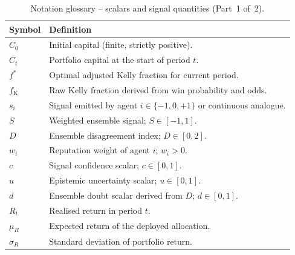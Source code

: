 \documentclass[12pt,openany]{book}
\numberwithin{equation}{chapter}
\theoremstyle{plain}
\theoremstyle{definition}
\theoremstyle{remark}
\numberwithin{equation}{chapter}
\theoremstyle{plain}
\begin{document}
\begin{table}[H]
\centering
\caption{Notation glossary -- scalars and signal quantities (Part~1 of~2).}
\label{tab:notation-1}
\small
\begin{tabularx}{\linewidth}{@{} l X @{}}
\toprule
\textbf{Symbol} & \textbf{Definition} \\
\midrule
$C_0$   & Initial capital (finite, strictly positive). \\[2pt]
$C_t$   & Portfolio capital at the start of period $t$. \\[2pt]
$f^*$   & Optimal adjusted Kelly fraction for current period. \\[2pt]
$f_{\mathrm{K}}$ & Raw Kelly fraction derived from win probability and odds. \\[2pt]
$s_i$   & Signal emitted by agent $i\in\{-1,0,+1\}$ or continuous analogue. \\[2pt]
$S$     & Weighted ensemble signal; $S\in[-1,1]$. \\[2pt]
$D$     & Ensemble disagreement index; $D\in[0,2]$. \\[2pt]
$w_i$   & Reputation weight of agent $i$; $w_i>0$. \\[2pt]
$c$     & Signal confidence scalar; $c\in[0,1]$. \\[2pt]
$u$     & Epistemic uncertainty scalar; $u\in[0,1]$. \\[2pt]
$d$     & Ensemble doubt scalar derived from $D$; $d\in[0,1]$. \\[2pt]
$R_t$   & Realised return in period $t$. \\[2pt]
$\mu_R$ & Expected return of the deployed allocation. \\[2pt]
$\sigma_R$ & Standard deviation of portfolio return. \\
\bottomrule
\end{tabularx}
\end{table}
\end{document}

